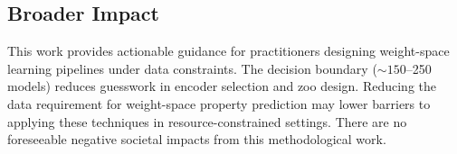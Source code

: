 \subsection{Broader Impact}

This work provides actionable guidance for practitioners designing weight-space learning pipelines under data constraints. The decision boundary (${\sim}150$--250 models) reduces guesswork in encoder selection and zoo design. Reducing the data requirement for weight-space property prediction may lower barriers to applying these techniques in resource-constrained settings. There are no foreseeable negative societal impacts from this methodological work.
